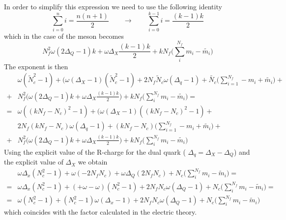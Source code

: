 \begin{appendices}
In order to simplify this expression we need to use the following identity
\begin{equation}
 \sum_{i=0}^{n} i =  \frac{n ( n + 1 )}{2} \qquad \longrightarrow 	\qquad  \sum_{i=0}^{k-1} i =  \frac{ (k-1)k}{2}
\end{equation}
which in the case of the meson becomes
\begin{equation}
N_f^2 \omega ( 2 \Delta_Q - 1) k + \omega \Delta_X  \frac{ ( k-1) k }{2} + k N_f \big( \sum_i^{N_f} m_i - \tilde{m_i} \big)
\end{equation}
The exponent is then
\begin{equation}
\begin{aligned}
&  \omega (\tilde {N}_c^2  - 1)  + ( \omega (\Delta_X - 1)( \tilde N_c^2 - 1) +  2   N_f \tilde N_c \omega (\Delta_q - 1 ) +  \tilde{N_c} \big( \sum_{i=1}^{N_f} - m_i + \tilde{m_i} \big) +\\
+ &  N_f^2 \big(   \omega (2 \Delta_Q -1) k + \omega \Delta_X  \frac{ ( k-1) k }{2} \big) + k N_f \big( \sum_i^{N_f} m_i - \tilde{m_i} \big)= \\
=&  \omega ( (k N_f -N_c)^2 - 1) + ( \omega (\Delta_X - 1)((k N_f -N_c)^2 - 1) + \\
& 2   N_f (k N_f -N_c) \omega (\Delta_q - 1 ) +  (k N_f -N_c) \big( \sum_{i=1}^{N_f} - m_i + \tilde{m_i} \big)  +\\
+&  N_f^2 \big(  \omega ( 2 \Delta_Q -1) k + \omega \Delta_X  \frac{ ( k-1) k }{2} \big) +  k N_f \big( \sum_i^{N_f} m_i - \tilde{m_i} \big)
\end{aligned}
\end{equation}
Using the explicit value of the R-charge for the dual quark ( $\Delta_q = \Delta_X -\Delta_Q $) and the explicit value of $\Delta_X$ we obtain
\begin{equation}
\begin{aligned}
 & \omega \Delta_x ( N_c^2 - 1) + \omega ( - 2 N_f N_c  ) + \omega \Delta_Q ( 2 N_f N_c )  + N_c \big( \sum_i^{N_f} m_i - \tilde m_i  \big) =  \\
 = & \omega \Delta_x ( N_c^2 - 1) + ( + \omega - \omega)  ( N_c^2 -1 ) + 2 N_f N_c  \omega ( \Delta_Q -1 )  +  N_c \big( \sum_i^{N_f} m_i - \tilde m_i  \big) = \\
 = &\omega ( N_c^2 -1 ) + ( N_c^2 - 1) \omega (\Delta_x  - 1 ) + 2 N_f N_c  \omega ( \Delta_Q -1 )  + N_c \big( \sum_i^{N_f} m_i - \tilde m_i  \big)
\end{aligned}
\end{equation}
which coincides with the factor calculated in the electric theory.
\clearpage


\end{appendices}

